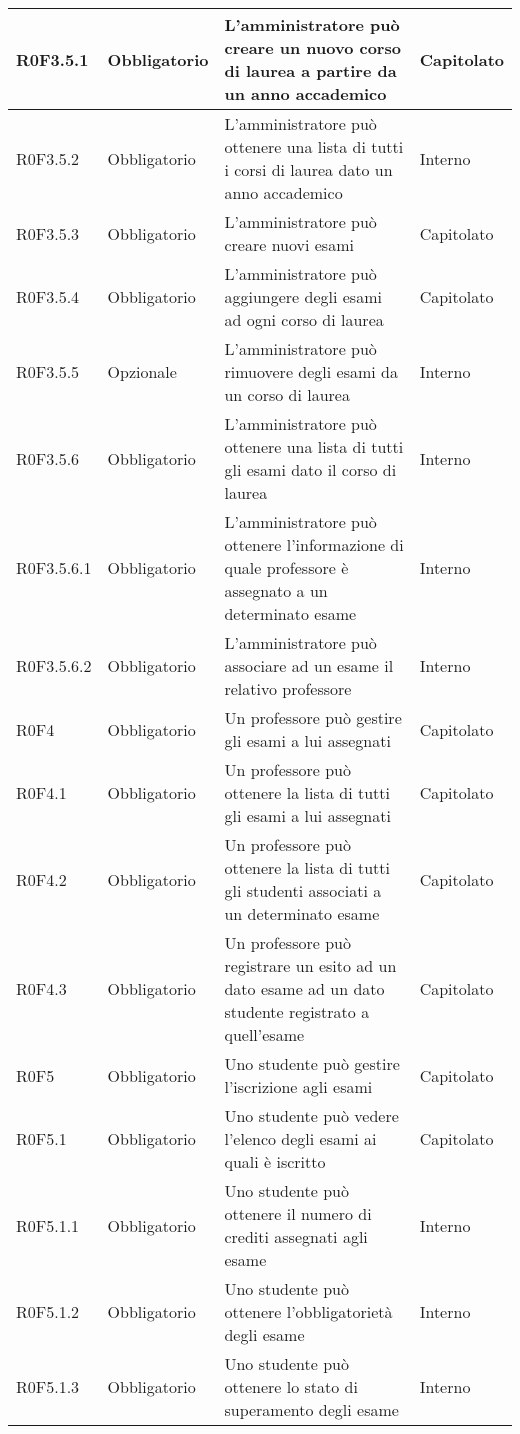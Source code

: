 \documentclass[AnalisiDeiRequisiti.tex]{subfiles}
\begin{document}
\begin{longtable}[H]{|p{2.5cm}|p{2.5cm}|p{5cm}|p{2cm}|}
	R0F3.5.1 & Obbligatorio & L'amministratore può creare un nuovo corso di laurea a partire da un anno accademico & Capitolato \\ \hline
	R0F3.5.2 & Obbligatorio & L'amministratore può ottenere una lista di tutti i corsi di laurea dato un anno accademico & Interno \\ \hline
	R0F3.5.3 & Obbligatorio & L'amministratore può creare nuovi esami & Capitolato \\ \hline
	R0F3.5.4 & Obbligatorio & L'amministratore può aggiungere degli esami ad ogni corso di laurea & Capitolato \\ \hline
	R0F3.5.5 & Opzionale & L'amministratore può rimuovere degli esami da un corso di laurea & Interno \\ \hline
	R0F3.5.6 & Obbligatorio & L'amministratore può ottenere una lista di tutti gli esami dato il corso di laurea & Interno \\ \hline
	R0F3.5.6.1 & Obbligatorio & L'amministratore può ottenere l'informazione di quale professore è assegnato a un determinato esame & Interno \\ \hline
	R0F3.5.6.2  & Obbligatorio & L'amministratore può associare ad un esame il relativo professore & Interno \\ \hline
	R0F4 & Obbligatorio & Un professore può gestire gli esami a lui assegnati & Capitolato \\ \hline
	R0F4.1 & Obbligatorio & Un professore può ottenere la lista di tutti gli esami a lui assegnati & Capitolato \\ \hline
	R0F4.2 & Obbligatorio & Un professore può ottenere la lista di tutti gli studenti associati a un determinato esame & Capitolato \\ \hline
	R0F4.3 & Obbligatorio & Un professore può registrare un esito ad un dato esame ad un dato studente registrato a quell'esame & Capitolato \\ \hline
	R0F5 & Obbligatorio & Uno studente può gestire l'iscrizione agli esami & Capitolato \\ \hline
	R0F5.1 & Obbligatorio & Uno studente può vedere l'elenco degli esami ai quali è iscritto & Capitolato \\ \hline
	R0F5.1.1 & Obbligatorio & Uno studente può ottenere il numero di crediti assegnati agli esame & Interno \\ \hline
	R0F5.1.2 & Obbligatorio & Uno studente può ottenere l'obbligatorietà degli esame & Interno \\ \hline
	R0F5.1.3 & Obbligatorio & Uno studente può ottenere lo stato di superamento degli esame & Interno \\ \hline

\end{longtable}
\end{document}
